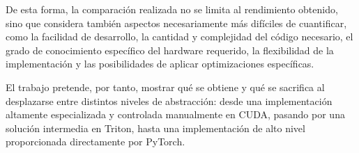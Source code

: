 De esta forma, la comparación realizada no se limita al rendimiento obtenido, sino que considera también aspectos necesariamente más difíciles de cuantificar, como la facilidad de desarrollo, la cantidad y complejidad del código necesario, el grado de conocimiento específico del hardware requerido, la flexibilidad de la implementación y las posibilidades de aplicar optimizaciones específicas.

El trabajo pretende, por tanto, mostrar qué se obtiene y qué se sacrifica al desplazarse entre distintos niveles de abstracción: desde una implementación altamente especializada y controlada manualmente en CUDA, pasando por una solución intermedia en Triton, hasta una implementación de alto nivel proporcionada directamente por PyTorch.
